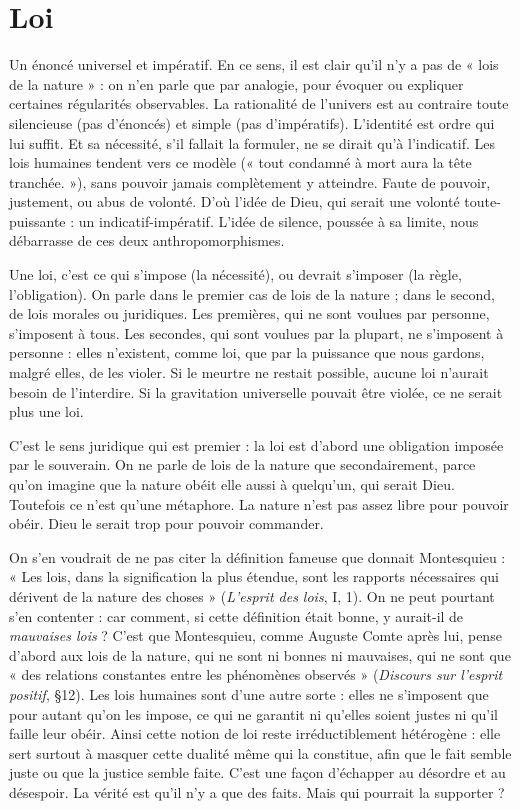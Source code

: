
\section{Loi}
Un énoncé universel et impératif. En ce sens, il est clair qu’il n’y a pas
de « lois de la nature » : on n’en parle que par analogie, pour évoquer
ou expliquer certaines régularités observables. La rationalité de l’univers est au
contraire toute silencieuse (pas d’énoncés) et simple (pas d’impératifs). L’identité
est ordre qui lui suffit. Et sa nécessité, s’il fallait la formuler, ne se dirait
qu’à l’indicatif. Les lois humaines tendent vers ce modèle (« tout condamné à
mort aura la tête tranchée. »), sans pouvoir jamais complètement y atteindre.
Faute de pouvoir, justement, ou abus de volonté. D’où l’idée de Dieu, qui
serait une volonté toute-puissante : un indicatif-impératif. L’idée de silence,
poussée à sa limite, nous débarrasse de ces deux anthropomorphismes.

Une loi, c’est ce qui s’impose (la nécessité), ou devrait s'imposer (la règle,
l'obligation). On parle dans le premier cas de lois de la nature ; dans le second,
de lois morales ou juridiques. Les premières, qui ne sont voulues par personne,
s'imposent à tous. Les secondes, qui sont voulues par la plupart, ne s'imposent
à personne : elles n’existent, comme loi, que par la puissance que nous gardons,
malgré elles, de les violer. Si le meurtre ne restait possible, aucune loi n’aurait
besoin de l’interdire. Si la gravitation universelle pouvait être violée, ce ne serait
plus une loi.

C’est le sens juridique qui est premier : la loi est d’abord une obligation
imposée par le souverain. On ne parle de lois de la nature que secondairement,
parce qu’on imagine que la nature obéit elle aussi à quelqu'un, qui serait Dieu.
Toutefois ce n’est qu’une métaphore. La nature n’est pas assez libre pour pouvoir
obéir. Dieu le serait trop pour pouvoir commander.

On s’en voudrait de ne pas citer la définition fameuse que donnait
Montesquieu : « Les lois, dans la signification la plus étendue, sont les rapports
nécessaires qui dérivent de la nature des choses » ({\it L'esprit des lois}, I, 1). On ne
peut pourtant s’en contenter : car comment, si cette définition était bonne, y
aurait-il de {\it mauvaises lois} ? C’est que Montesquieu, comme Auguste Comte
après lui, pense d’abord aux lois de la nature, qui ne sont ni bonnes ni mauvaises,
qui ne sont que « des relations constantes entre les phénomènes
observés » ({\it Discours sur l'esprit positif}, \S 12). Les lois humaines sont d’une autre
sorte : elles ne s’imposent que pour autant qu’on les impose, ce qui ne garantit
ni qu’elles soient justes ni qu’il faille leur obéir. Ainsi cette notion de loi reste
irréductiblement hétérogène : elle sert surtout à masquer cette dualité même
qui la constitue, afin que le fait semble juste ou que la justice semble faite. C’est
une façon d’échapper au désordre et au désespoir. La vérité est qu’il n’y a que
des faits. Mais qui pourrait la supporter ?

